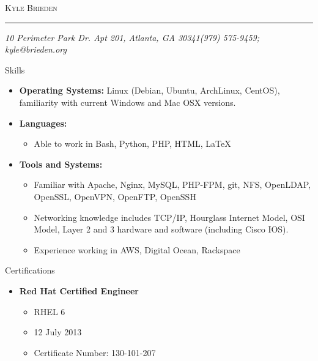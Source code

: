 \documentclass[10pt,oneside]{article}
\makeatletter
\newcommand{\name}{Kyle Brieden}
\newcommand{\addr}{10 Perimeter Park Dr. Apt 201, Atlanta, GA 30341}
\newcommand{\phone}{(979) 575-9459}
\newcommand{\email}{kyle@brieden.org}
\newcommand{\bigname}[1]{
    \begin{center}\fontfamily{phv}\selectfont\Huge\scshape#1\end{center}
}
\newenvironment{ressection}[1]{
    \vspace{4pt}
    {\fontfamily{phv}\selectfont\Large#1}
    \begin{itemize}
    \vspace{3pt}
}{
    \end{itemize}
}
\newcommand{\resitem}[1]{
    \vspace{-4pt}
    \item \begin{flushleft} #1 \end{flushleft}
}
\newcommand{\ressubitem}[1]{
    \vspace{-1pt}
    \item \begin{flushleft} #1 \end{flushleft}
}
\newcommand{\resbigitem}[3]{
    \vspace{-5pt}
    \item
    \textbf{#3} \\
    \textit{#1}---#2
}
\newenvironment{ressubsec}[3]{
    \resbigitem{#1}{#2}{#3}
    \vspace{-2pt}
    \begin{itemize}
}{
    \end{itemize}
}
\newenvironment{reslist}[1]{
    \resitem{\textbf{#1}}
    \vspace{-5pt}
    \begin{itemize}
}{
    \end{itemize}
}
\makeatother
\begin{document}
 \selectfont

\bigname{\name}

\vspace{-8pt} \rule{\textwidth}{1pt}

\vspace{-1pt} {\small\itshape \addr \hfill \phone; \email}

\vspace{8 pt}




%
%
%
%
\begin{ressection}{Skills}

    \resitem{\textbf{Operating Systems:} Linux (Debian, Ubuntu, ArchLinux, CentOS), familiarity with current Windows and Mac OSX versions.}

    \begin{reslist}{Languages:}

        \ressubitem{Able to work in Bash, Python, PHP, HTML, \LaTeX\ }

    \end{reslist}

    \begin{reslist}{Tools and Systems:}

        \ressubitem{Familiar with Apache, Nginx, MySQL, PHP-FPM, git, NFS, OpenLDAP, OpenSSL, OpenVPN, OpenFTP, OpenSSH}

        \ressubitem{Networking knowledge includes TCP/IP, Hourglass Internet Model, OSI Model, Layer 2 and 3 hardware and software (including Cisco IOS).}

		\ressubitem{Experience working in AWS, Digital Ocean, Rackspace}
    \end{reslist}


\end{ressection}


\begin{ressection}{Certifications}
    \begin{reslist}{Red Hat Certified Engineer}
        \ressubitem{RHEL 6}
        \ressubitem{12 July 2013}
        \ressubitem{Certificate Number: 130-101-207}
    \end{reslist}
\end{ressection}
\end{document}
